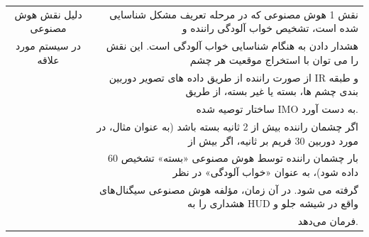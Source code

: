 \documentclass[a4paper,10pt]{article}
\begin{document}
\begin{table}[htbp]
\begin{tabularx}{\textwidth}{c c c c X}
            \multicolumn{2}{c}{دلیل نقش هوش مصنوعی} & \multicolumn{3}{r}{نقش 1 هوش مصنوعی که در مرحله تعریف مشکل شناسایی شده است، تشخیص خواب آلودگی راننده و} \\
            \multicolumn{2}{c}{در سیستم مورد علاقه} & \multicolumn{3}{r}{هشدار دادن به هنگام شناسایی خواب آلودگی است. این نقش را می توان با استخراج موقعیت هر چشم} \\
            \multicolumn{2}{c}{} & \multicolumn{3}{r}{از صورت راننده از طریق داده های تصویر دوربین IR و طبقه بندی چشم ها، بسته یا غیر بسته، از طریق} \\
            \multicolumn{2}{c}{} & \multicolumn{3}{r}{ساختار توصیه شده IMO به دست آورد.} \\
            \multicolumn{2}{c}{} & \multicolumn{3}{r}{اگر چشمان راننده بیش از 2 ثانیه بسته باشد (به عنوان مثال، در مورد دوربین 30 فریم بر ثانیه، اگر بیش از} \\
            \multicolumn{2}{c}{} & \multicolumn{3}{r}{60 بار چشمان راننده توسط هوش مصنوعی «بسته» تشخیص داده شود)، به عنوان «خواب آلودگی» در نظر} \\
            \multicolumn{2}{c}{} & \multicolumn{3}{r}{گرفته می شود. در آن زمان، مؤلفه هوش مصنوعی سیگنال‌های هشداری را به HUD واقع در شیشه جلو و} \\
            \multicolumn{2}{c}{} & \multicolumn{3}{r}{فرمان می‌دهد.} \\

            \hline

        \end{tabularx}
        
    \end{table}

    \newpage

\end{document}
